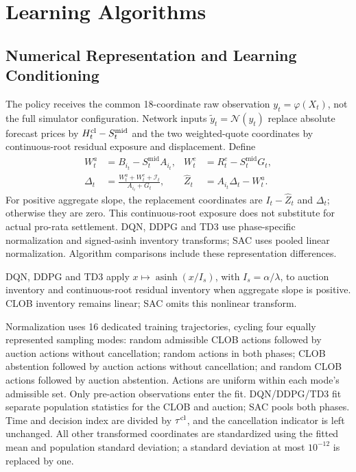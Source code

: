 \documentclass[11pt]{article}
\begin{document}
\section{Learning Algorithms}
\label{sec:learning}
\label{app:implementation}
\begingroup
\subsection{Numerical Representation and Learning Conditioning}
\label{subsec:conditioning}
The policy receives the common 18-coordinate raw observation $y_t=\varphi(X_t)$, not the full simulator configuration. Network inputs $\tilde y_t=\mathcal N(y_t)$ replace absolute forecast prices by $H_t^{\mathrm{cl}}-S_t^{\mathrm{mid}}$ and the two weighted-quote coordinates by continuous-root residual exposure and displacement. Define
\[
\begin{aligned}
W_t^a&=B_{i_t}-S_t^{\mathrm{mid}}A_{i_t},&
W_t^e&={R_t^e}-S_t^{\mathrm{mid}}G_t,\\
\Delta_t&=\frac{W_t^a+W_t^e+\mathcal I_t}{A_{i_t}+G_t},&
\hat Z_t&=A_{i_t}\Delta_t-W_t^a.
\end{aligned}
\]
For positive aggregate slope, the replacement coordinates are $I_t-\hat Z_t$ and $\Delta_t$; otherwise they are zero. This continuous-root exposure does not substitute for actual pro-rata settlement. DQN, DDPG and TD3 use phase-specific normalization and signed-asinh inventory transforms; SAC uses pooled linear normalization. Algorithm comparisons include these representation differences.\vspace{0.5em}

DQN, DDPG and TD3 apply $x\mapsto\operatorname{asinh}(x/I_s)$, with $I_s=\alpha/\lambda$, to auction inventory and continuous-root residual inventory when aggregate slope is positive. CLOB inventory remains linear; SAC omits this nonlinear transform.\vspace{0.5em}

Normalization uses 16 dedicated training trajectories, cycling four equally represented sampling modes: random admissible CLOB actions followed by auction actions without cancellation; random actions in both phases; CLOB abstention followed by auction actions without cancellation; and random CLOB actions followed by auction abstention. Actions are uniform within each mode's admissible set. Only pre-action observations enter the fit. DQN/DDPG/TD3 fit separate population statistics for the CLOB and auction; SAC pools both phases. Time and decision index are divided by $\tau^{\mathrm{cl}}$, and the cancellation indicator is left unchanged. All other transformed coordinates are standardized using the fitted mean and population standard deviation; a standard deviation at most $10^{-12}$ is replaced by one.\vspace{0.5em}
\end{document}
